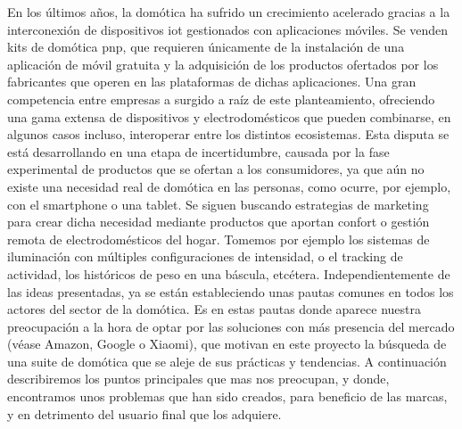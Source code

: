 En los últimos años, la domótica ha sufrido un crecimiento acelerado gracias a la interconexión de dispositivos \gls{iot} gestionados con aplicaciones móviles. Se venden kits de domótica \Gls{pnp}, que requieren únicamente de la instalación de una aplicación de móvil gratuita y la adquisición de los productos ofertados por los fabricantes que operen en las plataformas de dichas aplicaciones. Una gran competencia entre empresas a surgido a raíz de este planteamiento, ofreciendo una gama extensa de dispositivos y electrodomésticos que pueden combinarse, en algunos casos incluso, interoperar entre los distintos ecosistemas. Esta disputa se está desarrollando en una etapa de incertidumbre, causada por la fase experimental de productos que se ofertan a los consumidores, ya que aún no existe una necesidad real de domótica en las personas, como ocurre, por ejemplo, con el \gls{smartphone} o una \gls{tablet}. Se siguen buscando estrategias de marketing para crear dicha necesidad mediante productos que aportan confort o gestión remota de electrodomésticos del hogar. Tomemos por ejemplo los sistemas de iluminación con múltiples configuraciones de intensidad, o el tracking de actividad, los históricos de peso en una báscula, etcétera. Independientemente de las ideas presentadas, ya se están estableciendo unas pautas comunes en todos los actores del sector de la domótica. Es en estas pautas donde aparece nuestra preocupación a la hora de optar por las soluciones con más presencia del mercado (véase Amazon, Google o Xiaomi), que motivan en este proyecto la búsqueda de una suite de domótica que se aleje de sus prácticas y tendencias. A continuación describiremos los puntos principales que mas nos preocupan, y donde, encontramos unos problemas que han sido creados, para beneficio de las marcas, y en detrimento del usuario final que los adquiere.

\vspace{1cm}

